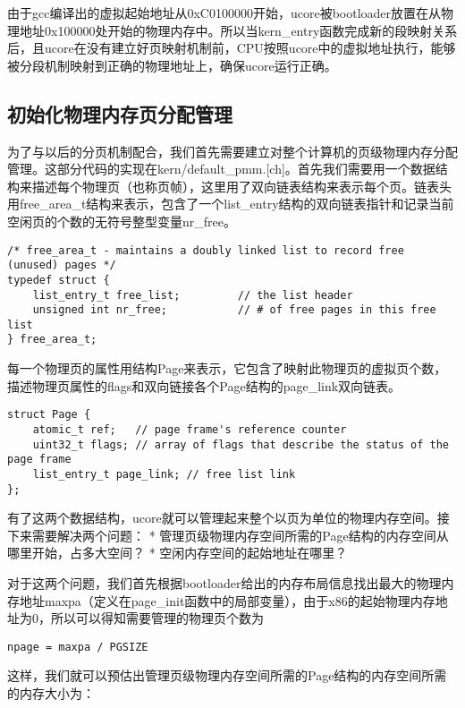 由于gcc编译出的虚拟起始地址从0xC0100000开始，ucore被bootloader放置在从物理地址0x100000处开始的物理内存中。所以当kern\_entry函数完成新的段映射关系后，且ucore在没有建立好页映射机制前，CPU按照ucore中的虚拟地址执行，能够被分段机制映射到正确的物理地址上，确保ucore运行正确。

\subsection{初始化物理内存页分配管理}\label{ux521dux59cbux5316ux7269ux7406ux5185ux5b58ux9875ux5206ux914dux7ba1ux7406}

为了与以后的分页机制配合，我们首先需要建立对整个计算机的页级物理内存分配管理。这部分代码的实现在kern/default\_pmm.{[}ch{]}。首先我们需要用一个数据结构来描述每个物理页（也称页帧），这里用了双向链表结构来表示每个页。链表头用free\_area\_t结构来表示，包含了一个list\_entry结构的双向链表指针和记录当前空闲页的个数的无符号整型变量nr\_free。

\begin{lstlisting}
/* free_area_t - maintains a doubly linked list to record free (unused) pages */
typedef struct {
    list_entry_t free_list;         // the list header
    unsigned int nr_free;           // # of free pages in this free list
} free_area_t;
\end{lstlisting}

每一个物理页的属性用结构Page来表示，它包含了映射此物理页的虚拟页个数，描述物理页属性的flags和双向链接各个Page结构的page\_link双向链表。

\begin{lstlisting}
struct Page {
    atomic_t ref;   // page frame's reference counter
    uint32_t flags; // array of flags that describe the status of the page frame
    list_entry_t page_link; // free list link
};
\end{lstlisting}

有了这两个数据结构，ucore就可以管理起来整个以页为单位的物理内存空间。接下来需要解决两个问题：
* 管理页级物理内存空间所需的Page结构的内存空间从哪里开始，占多大空间？ *
空闲内存空间的起始地址在哪里？

对于这两个问题，我们首先根据bootloader给出的内存布局信息找出最大的物理内存地址maxpa（定义在page\_init函数中的局部变量），由于x86的起始物理内存地址为0，所以可以得知需要管理的物理页个数为

\begin{lstlisting}
npage = maxpa / PGSIZE
\end{lstlisting}

这样，我们就可以预估出管理页级物理内存空间所需的Page结构的内存空间所需的内存大小为：

